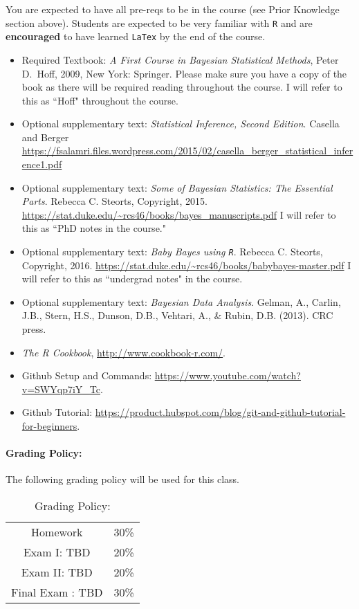 \documentclass[11pt]{article}
\begin{document}
You are expected to have all pre-reqs to be in the course (see Prior Knowledge section above). Students are expected to be very familiar with \texttt{R} and are \textbf{encouraged} to have learned \texttt{LaTex} by the end of the course. 

\begin{itemize}
\item[] Required Textbook: \textit{A First Course in Bayesian Statistical Methods}, Peter D.\ Hoff, 2009, New York: Springer. Please make sure you have a copy of the book as there will be required reading throughout the course. I will refer to this as ``Hoff" throughout the course. 
\item[] Optional supplementary text:  \textit{Statistical Inference, Second Edition}. Casella and Berger \url{https://fsalamri.files.wordpress.com/2015/02/casella_berger_statistical_inference1.pdf}
\item[] Optional supplementary text:  \textit{Some of Bayesian Statistics: The Essential Parts}. Rebecca C. Steorts, Copyright, 2015. \url{https://stat.duke.edu/~rcs46/books/bayes_manuscripts.pdf} I will refer to this as ``PhD notes in the course."
\item[] Optional supplementary text:  \textit{Baby Bayes using \texttt{R}}. Rebecca C. Steorts, Copyright, 2016. 
\url{https://stat.duke.edu/~rcs46/books/babybayes-master.pdf} I will refer to this as ``undergrad notes" in the course. 
\item[] Optional supplementary text:  \textit{Bayesian Data Analysis}. Gelman, A., Carlin, J.B., Stern, H.S., Dunson, D.B., Vehtari, A., \& Rubin, D.B. (2013). CRC press.
\item[] \emph{The R Cookbook}, \url{http://www.cookbook-r.com/}.
\item[] Github Setup and Commands: \url{https://www.youtube.com/watch?v=SWYqp7iY_Tc}.
\item[] Github Tutorial: \url{https://product.hubspot.com/blog/git-and-github-tutorial-for-beginners}.

\end{itemize}

\paragraph{Grading Policy:} 
The following grading policy will be used for this class. 

\begin{table}[h!]
\caption{Grading Policy:}
\begin{center}
\begin{tabular}{cc}
Homework &30\%\\
Exam I:  TBD &20\%\\
Exam  II: TBD & 20\%\\
Final Exam :  TBD & 30\%\\
\end{tabular}
\end{center}
\label{default}
\end{table}%
\end{document}
